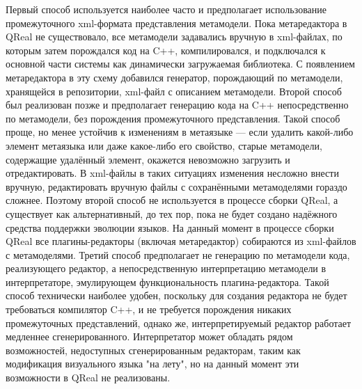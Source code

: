 \documentclass[a4paper]{article}
\begin{document}
{Первый способ используется наиболее часто и предполагает использование промежуточного xml-формата представления метамодели. Пока метаредактора в QReal не существовало, все метамодели задавались вручную в xml-файлах, по которым затем порождался код на C++, компилировался, и подключался к основной части системы как динамически загружаемая библиотека. С появлением метаредактора в эту схему добавился генератор, порождающий по метамодели, хранящейся в репозитории, xml-файл с описанием метамодели. Второй способ был реализован позже и предполагает генерацию кода на C++ непосредственно по метамодели, без порождения промежуточного представления. Такой способ проще, но менее устойчив к изменениям в метаязыке --- если удалить какой-либо элемент метаязыка или даже какое-либо его свойство, старые метамодели, содержащие удалённый элемент, окажется невозможно загрузить и отредактировать. В xml-файлы в таких ситуациях изменения несложно внести вручную, редактировать вручную файлы с сохранёнными метамоделями гораздо сложнее. Поэтому второй способ не используется в процессе сборки QReal, а существует как альтернативный, до тех пор, пока не будет создано надёжного средства поддержки эволюции языков. На данный момент в процессе сборки QReal все плагины-редакторы (включая метаредактор) собираются из xml-файлов с метамоделями. Третий способ предполагает не генерацию по метамодели кода, реализующего редактор, а непосредственную интерпретацию метамодели в интерпретаторе, эмулирующем функциональность плагина-редактора. Такой способ технически наиболее удобен, поскольку для создания редактора не будет требоваться компилятор C++, и не требуется порождения никаких промежуточных представлений, однако же, интерпретируемый редактор работает медленнее сгенерированного. Интерпретатор может обладать рядом возможностей, недоступных сгенерированным редакторам, таким как модификация визуального языка "на лету", но на данный момент эти возможности в QReal не реализованы.

}
\end{document}
